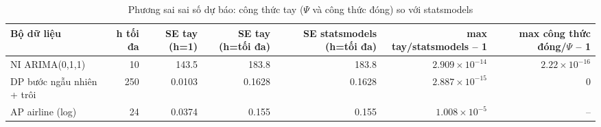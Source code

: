 \begin{table}[H]
\centering\footnotesize
\caption{Phương sai sai số dự báo: công thức tay ($\Psi$ và công thức đóng) so với statsmodels}\label{tab:tab_b12_08_forecast_variance}
\begin{adjustbox}{max width=\linewidth}
\begin{tabular}{|l|r|r|r|r|r|r|}
\toprule
Bộ dữ liệu & h tối đa & SE tay (h=1) & SE tay (h=tối đa) & SE statsmodels (h=tối đa) & max \textbar{}tay/statsmodels – 1\textbar{} & max \textbar{}công thức đóng/$\Psi$ – 1\textbar{} \\
\midrule
NI ARIMA(0,1,1) & 10 & 143.5 & 183.8 & 183.8 & $2.909\times10^{-14}$ & $2.22\times10^{-16}$ \\
DP bước ngẫu nhiên + trôi & 250 & 0.0103 & 0.1628 & 0.1628 & $2.887\times10^{-15}$ & 0 \\
AP airline (log) & 24 & 0.0374 & 0.155 & 0.155 & $1.008\times10^{-5}$ & – \\
\bottomrule
\end{tabular}
\end{adjustbox}
\end{table}
